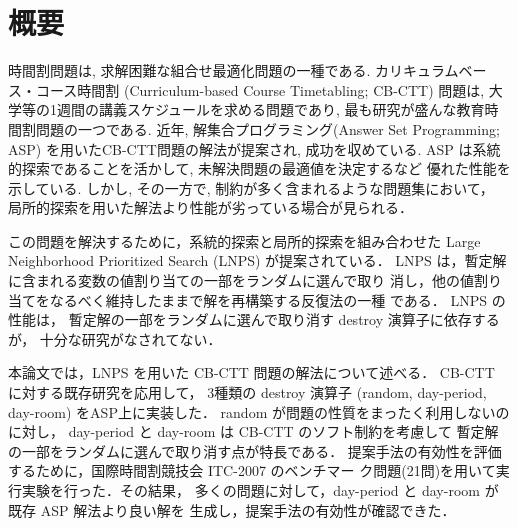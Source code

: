 \chapter*{概要}




時間割問題は, 
求解困難な組合せ最適化問題の一種である. 
カリキュラムベース・コース時間割 
(Curriculum-based Course Timetabling; CB-CTT) 
問題は, 大学等の1週間の講義スケジュールを求める問題であり, 
最も研究が盛んな教育時間割問題の一つである. 
近年, 解集合プログラミング(Answer Set Programming; ASP)
を用いたCB-CTT問題の解法が提案され, 成功を収めている. 
ASP は系統的探索であることを活かして,
未解決問題の最適値を決定するなど
優れた性能を示している.  
しかし, その一方で, 制約が多く含まれるような問題集において，
局所的探索を用いた解法より性能が劣っている場合が見られる．

この問題を解決するために，系統的探索と局所的探索を組み合わせた
Large Neighborhood Prioritized Search (LNPS)
が提案されている．
LNPS は，暫定解に含まれる変数の値割り当ての一部をランダムに選んで取り
消し，他の値割り当てをなるべく維持したままで解を再構築する反復法の一種
である．
LNPS の性能は，
暫定解の一部をランダムに選んで取り消す destroy 演算子に依存するが，
十分な研究がなされてない．

本論文では，LNPS を用いた CB-CTT 問題の解法について述べる．
CB-CTT に対する既存研究を応用して，
3種類の destroy 演算子 (random, day-period, day-room) をASP上に実装した．
random が問題の性質をまったく利用しないのに対し，
day-period と day-room は CB-CTT のソフト制約を考慮して
暫定解の一部をランダムに選んで取り消す点が特長である．
%
提案手法の有効性を評価するために，国際時間割競技会 ITC-2007 のベンチマー
ク問題(21問)を用いて実行実験を行った．その結果，
多くの問題に対して，day-period と day-room が既存 ASP 解法より良い解を
生成し，提案手法の有効性が確認できた．

